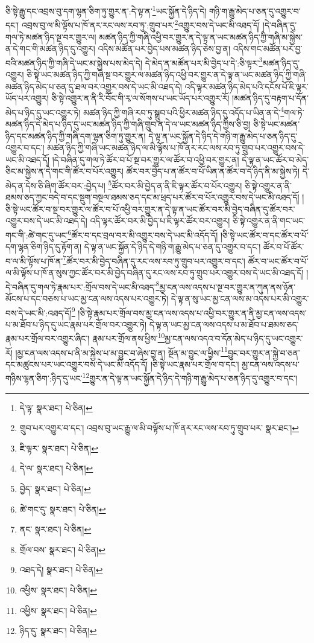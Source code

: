ཅི་སྟེ་རྒྱུ་དང་འབྲས་བུ་དག་ལྷན་ཅིག་ཏུ་གྱུར་ན་:དེ་ལྟ་ན་\footnote{དེ་ལྟ་  སྣར་ཐང་།  པེ་ཅིན། }ཡང་སྐྱོན་དེ་ཉིད་དེ། གཉི་ག་རྒྱུ་མེད་པ་ཅན་དུ་འགྱུར་བ་དང་། འབྲས་བུ་ལ་མི་ལྟོས་པ་ཁོ་ནར་རང་ལས་རབ་ཏུ་:གྲུབ་པར་\footnote{གྲུབ་པར་འགྱུར་བ་དང་། འབྲས་བུ་ཡང་རྒྱུ་ལ་མི་བལྟོས་པ་ཁོ་ནར་རང་ལས་རབ་ཏུ་གྲུབ་པར་  སྣར་ཐང་། }འགྱུར་བས་དེ་ཡང་མི་འཐད་དོ། །དེ་བཞིན་དུ་གལ་ཏེ་མཚན་ཉིད་སྔ་བར་གྱུར་ལ། མཚན་ཉིད་ཀྱི་གཞི་འཕྱི་བར་གྱུར་ན་དེ་ལྟ་ན་ཡང་མཚན་ཉིད་ཀྱི་གཞི་མ་སྐྱེས་ན་དེ་གང་གི་མཚན་ཉིད་དུ་འགྱུར། འདིས་མཚོན་པར་བྱེད་པས་མཚན་ཉིད་ཅེས་བྱ་ན། འདིས་གང་མཚོན་པར་བྱ་བའི་མཚན་ཉིད་ཀྱི་གཞི་དེ་ཡང་མ་སྐྱེས་པས་མེད་དེ། དེ་མེད་ན་མཚོན་པར་མི་བྱེད་པ་དེ་:ཅི་ལྟར་\footnote{ཇི་ལྟར་  སྣར་ཐང་།  པེ་ཅིན། }མཚན་ཉིད་དུ་འགྱུར། ཅི་སྟེ་ཡང་མཚན་ཉིད་ཀྱི་གཞི་སྔ་བར་གྱུར་ལ་མཚན་ཉིད་འཕྱི་བར་གྱུར་ན་དེ་ལྟ་ན་ཡང་མཚན་ཉིད་ཀྱི་གཞི་མཚན་ཉིད་མེད་པ་ཅན་དུ་ཐལ་བར་འགྱུར་བས་དེ་ཡང་མི་འཐད་དེ། འདི་ལྟར་མཚན་ཉིད་མེད་པའི་དངོས་པོ་ཇི་ལྟར་ཡོད་པར་འགྱུར། ཅི་སྟེ་འགྱུར་ན་ནི་རི་བོང་གི་རྭ་ལ་སོགས་པ་ཡང་ཡོད་པར་འགྱུར་རོ། །མཚན་ཉིད་དུ་བརྟག་པ་དོན་མེད་པ་ཉིད་དུ་ཡང་འགྱུར་ཏེ། མཚན་ཉིད་ཀྱི་གཞི་རབ་ཏུ་སྒྲུབ་པའི་ཕྱིར་མཚན་ཉིད་དུ་འདོད་པ་ཡིན་ན་དེ་\footnote{དེ་ལ་  སྣར་ཐང་།  པེ་ཅིན། }གལ་ཏེ་མཚན་ཉིད་དེ་མེད་པ་ཉིད་དུ་ཡང་མཚན་ཉིད་ཀྱི་གཞི་གྲུབ་ན་དེ་ལ་ཡང་མཚན་ཉིད་ཀྱིས་ཅི་བྱ། ཅི་སྟེ་ཡང་མཚན་ཉིད་དང་མཚན་ཉིད་ཀྱི་གཞི་དག་ལྷན་ཅིག་ཏུ་གྱུར་ན། དེ་ལྟ་ན་ཡང་སྐྱོན་དེ་ཉིད་དེ་གཉི་ག་རྒྱུ་མེད་པ་ཅན་ཉིད་དུ་འགྱུར་བ་དང་། མཚན་ཉིད་ཀྱི་གཞི་ཡང་མཚན་ཉིད་ལ་མི་ལྟོས་པ་ཁོ་ནར་རང་ལས་རབ་ཏུ་གྲུབ་པར་འགྱུར་བས་དེ་ཡང་མི་འཐད་དོ། །དེ་བཞིན་དུ་གལ་ཏེ་ཚོར་བ་པོ་སྔ་བར་གྱུར་ལ་ཚོར་བ་འཕྱི་བར་གྱུར་ན། དེ་ལྟ་ན་ཡང་ཚོར་བ་མེད་ཅིང་མ་སྐྱེས་ན་དེ་གང་གི་ཚོར་བ་པོར་འགྱུར། ཚོར་བར་བྱེད་པ་ན་ཚོར་བ་པོ་ཡིན་ན་ཚོར་བ་དེ་ཉིད་ནི་མ་སྐྱེས་ཏེ། དེ་མེད་ན་དེས་ཅི་ཞིག་ཚོར་བར་:བྱེད་པ། \footnote{བྱེད་  སྣར་ཐང་།  པེ་ཅིན། }ཚོར་བར་མི་བྱེད་ན་ནི་ཇི་ལྟར་ཚོར་བ་པོར་འགྱུར། ཅི་སྟེ་འགྱུར་ན་ནི་ཐམས་ཅད་ཀྱང་བདེ་བ་དང་སྡུག་བསྔལ་ཐམས་ཅད་དང་མ་ཕྲད་པར་ཚོར་བ་པོར་འགྱུར་བས་དེ་ཡང་མི་འཐད་དོ། །ཅི་སྟེ་ཡང་ཚོར་བ་སྔ་བར་གྱུར་ལ་ཚོར་བ་པོ་འཕྱི་བར་གྱུར་ན་དེ་ལྟ་ན་ཡང་ཚོར་བར་མི་བྱེད་བཞིན་དུ་ཚོར་བར་འགྱུར་བས་དེ་ཡང་མི་འཐད་དེ། འདི་ལྟར་ཚོར་བར་མི་བྱེད་པ་ཇི་ལྟར་ཚོར་བར་འགྱུར། ཅི་སྟེ་འགྱུར་ན་ནི་གང་ཡང་གང་གི་:ཚེ་གང་དུ་ཡང་\footnote{ཚེ་གང་དུ་  སྣར་ཐང་།  པེ་ཅིན། }ཚོར་བ་དང་བྲལ་བར་མི་འགྱུར་བས་དེ་ཡང་མི་འདོད་དོ། །ཅི་སྟེ་ཡང་ཚོར་བ་དང་ཚོར་བ་པོ་དག་ལྷན་ཅིག་ཉིད་དུ་རྟོག་ན། དེ་ལྟ་ན་ཡང་སྐྱོན་དེ་ཉིད་དེ་གཉི་ག་རྒྱུ་མེད་པ་ཅན་དུ་འགྱུར་བ་དང་། ཚོར་བ་པོ་ཚོར་བ་ལ་མི་ལྟོས་པ་ཁོ་ན་\footnote{ནང་  སྣར་ཐང་།  པེ་ཅིན། }ཚོར་བར་མི་བྱེད་བཞིན་དུ་རང་ལས་རབ་ཏུ་གྲུབ་པར་འགྱུར་བ་དང་། ཚོར་བ་ཡང་ཚོར་བ་པོ་ལ་མི་ལྟོས་པ་ཁོ་ན་སུས་ཀྱང་ཚོར་བར་མི་བྱེད་བཞིན་དུ་རང་ལས་རབ་ཏུ་གྲུབ་པར་འགྱུར་བས་དེ་ཡང་མི་འཐད་དོ། །དེ་བཞིན་དུ་གལ་ཏེ་རྣམ་པར་:གྲོལ་བས་དེ་ཡང་མི་འཐད་\footnote{གྲོལ་བས་  སྣར་ཐང་།  པེ་ཅིན། }མྱ་ངན་ལས་འདས་པ་སྔ་བར་གྱུར་ན་ཀུན་ནས་ཉོན་མོངས་པ་དང་བཅས་པ་ཡང་མྱ་ངན་ལས་འདས་པར་འགྱུར་ཏེ། དེ་ལྟ་ན་སུ་ཡང་མྱ་ངན་ལས་མ་འདས་པར་མི་འགྱུར་བས་དེ་ཡང་མི་:འཐད་དོ།\footnote{འཐད་དེ།  སྣར་ཐང་།  པེ་ཅིན། } །ཅི་སྟེ་རྣམ་པར་གྲོལ་བས་མྱ་ངན་ལས་འདས་པ་འཕྱི་བར་གྱུར་ན་ནི་མྱ་ངན་ལས་འདས་པ་མ་ཐོབ་པ་ཉིད་དུ་ཡང་རྣམ་པར་གྲོལ་བར་འགྱུར་ཏེ། དེ་ལྟ་ན་ཡང་མྱ་ངན་ལས་འདས་པ་མ་ཐོབ་པ་ཐམས་ཅད་རྣམ་པར་གྲོལ་བར་འགྱུར་ཞིང་། རྣམ་པར་གྲོལ་ནས་ཕྱིས་\footnote{འཕྱིས་  སྣར་ཐང་།  པེ་ཅིན། }མྱ་ངན་ལས་འདའ་བ་དོན་མེད་པ་ཉིད་དུ་ཡང་འགྱུར་རོ། །མྱ་ངན་ལས་འདས་པ་ནི་མ་སྐྱེས་པ་མ་བྱུང་བ་ཞེས་བྱ་ན། སྔོན་མ་བྱུང་ལ་ཕྱིས་\footnote{འཕྱིས་  སྣར་ཐང་།  པེ་ཅིན། }བྱུང་བར་གྱུར་ན་སྐྱེ་བ་ཅན་དང་མཚུངས་པར་ཡང་འགྱུར་བས་དེ་ཡང་མི་འདོད་དོ། །ཅི་སྟེ་ཡང་རྣམ་པར་གྲོལ་བ་དང་། མྱ་ངན་ལས་འདས་པ་གཉིས་ལྷན་ཅིག་:ཉིད་དུ་ཡང་\footnote{ཉིད་དུ་  སྣར་ཐང་།  པེ་ཅིན། }གྱུར་ན་དེ་ལྟ་ན་ཡང་སྐྱོན་དེ་ཉིད་དེ་གཉི་ག་རྒྱུ་མེད་པ་ཅན་ཉིད་དུ་འགྱུར་བ་དང་། 